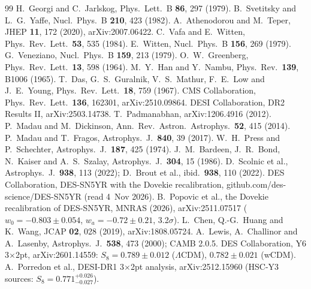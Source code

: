 \documentclass[11pt,a4paper]{article}
\begin{document}
\begin{thebibliography}{99}
 H.~Georgi and C.~Jarlskog, Phys.\ Lett.\ B \textbf{86}, 297 (1979).
 B.~Svetitsky and L.~G.~Yaffe, Nucl.\ Phys.\ B \textbf{210}, 423 (1982).
 A.~Athenodorou and M.~Teper, JHEP \textbf{11}, 172 (2020), arXiv:2007.06422.
 C.~Vafa and E.~Witten, Phys.\ Rev.\ Lett.\ \textbf{53}, 535 (1984).
 E.~Witten, Nucl.\ Phys.\ B \textbf{156}, 269 (1979).
 G.~Veneziano, Nucl.\ Phys.\ B \textbf{159}, 213 (1979).
 O.~W.~Greenberg, Phys.\ Rev.\ Lett.\ \textbf{13}, 598 (1964).
 M.~Y.~Han and Y.~Nambu, Phys.\ Rev.\ \textbf{139}, B1006 (1965).
 T.~Das, G.~S.~Guralnik, V.~S.~Mathur, F.~E.~Low and J.~E.~Young, Phys.\ Rev.\ Lett.\ \textbf{18}, 759 (1967).
 CMS Collaboration, Phys.\ Rev.\ Lett.\ \textbf{136}, 162301, arXiv:2510.09864.
 DESI Collaboration, DR2 Results II, arXiv:2503.14738.
 T.~Padmanabhan, arXiv:1206.4916 (2012).
 P.~Madau and M.~Dickinson, Ann.\ Rev.\ Astron.\ Astrophys.\ \textbf{52}, 415 (2014).
 P.~Madau and T.~Fragos, Astrophys.\ J.\ \textbf{840}, 39 (2017).
 W.~H.~Press and P.~Schechter, Astrophys.\ J.\ \textbf{187}, 425 (1974).
 J.~M.~Bardeen, J.~R.~Bond, N.~Kaiser and A.~S.~Szalay, Astrophys.\ J.\ \textbf{304}, 15 (1986).
 D.~Scolnic et al., Astrophys.\ J.\ \textbf{938}, 113 (2022); D.~Brout et al., ibid.\ \textbf{938}, 110 (2022).
 DES Collaboration, DES-SN5YR with the Dovekie recalibration, github.com/des-science/DES-SN5YR (read 4~Nov 2026).
 B.~Popovic et al., the Dovekie recalibration of DES-SN5YR, MNRAS (2026), arXiv:2511.07517 ($w_0=-0.803\pm0.054$, $w_a=-0.72\pm0.21$, 3.2$\sigma$).
 L.~Chen, Q.-G.~Huang and K.~Wang, JCAP \textbf{02}, 028 (2019), arXiv:1808.05724.
 A.~Lewis, A.~Challinor and A.~Lasenby, Astrophys.\ J.\ \textbf{538}, 473 (2000); CAMB 2.0.5.
 DES Collaboration, Y6 3$\times$2pt, arXiv:2601.14559: $S_8=0.789\pm0.012$ ($\Lambda$CDM), $0.782\pm0.021$ (wCDM).
 A.~Porredon et al., DESI-DR1 3$\times$2pt analysis, arXiv:2512.15960 (HSC-Y3 sources: $S_8=0.771^{+0.026}_{-0.027}$).
\end{thebibliography}
\end{document}
